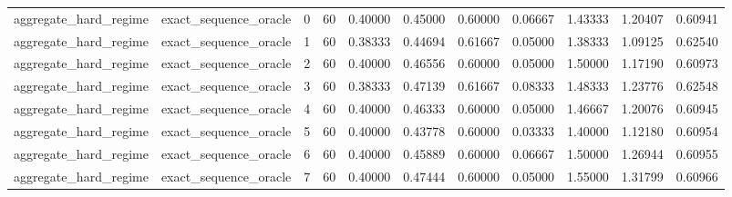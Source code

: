 \documentclass{article}
\begin{document}
\begin{table}[tbp]
{\begin{tabular}{lllllllllll}
aggregate\_hard\_regime & exact\_sequence\_oracle & 0 & 60 & 0.40000 & 0.45000 & 0.60000 & 0.06667 & 1.43333 & 1.20407 & 0.60941 \\
aggregate\_hard\_regime & exact\_sequence\_oracle & 1 & 60 & 0.38333 & 0.44694 & 0.61667 & 0.05000 & 1.38333 & 1.09125 & 0.62540 \\
aggregate\_hard\_regime & exact\_sequence\_oracle & 2 & 60 & 0.40000 & 0.46556 & 0.60000 & 0.05000 & 1.50000 & 1.17190 & 0.60973 \\
aggregate\_hard\_regime & exact\_sequence\_oracle & 3 & 60 & 0.38333 & 0.47139 & 0.61667 & 0.08333 & 1.48333 & 1.23776 & 0.62548 \\
aggregate\_hard\_regime & exact\_sequence\_oracle & 4 & 60 & 0.40000 & 0.46333 & 0.60000 & 0.05000 & 1.46667 & 1.20076 & 0.60945 \\
aggregate\_hard\_regime & exact\_sequence\_oracle & 5 & 60 & 0.40000 & 0.43778 & 0.60000 & 0.03333 & 1.40000 & 1.12180 & 0.60954 \\
aggregate\_hard\_regime & exact\_sequence\_oracle & 6 & 60 & 0.40000 & 0.45889 & 0.60000 & 0.06667 & 1.50000 & 1.26944 & 0.60955 \\
aggregate\_hard\_regime & exact\_sequence\_oracle & 7 & 60 & 0.40000 & 0.47444 & 0.60000 & 0.05000 & 1.55000 & 1.31799 & 0.60966 \\
\bottomrule
\end{tabular}
}
\end{table}

\clearpage
\end{document}
